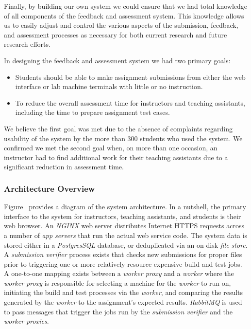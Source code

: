 Finally, by building our own system we could ensure that we had total knowledge
of all components of the feedback and assessment system. This knowledge allows
us to easily adjust and control the various aspects of the submission,
feedback, and assessment processes as necessary for both current research and
future research efforts.

In designing the feedback and assessment system we had two primary goals:

\begin{itemize}
\item Students should be able to make assignment submissions from either the
  web interface or lab machine terminals with little or no instruction.
\item To reduce the overall assessment time for instructors and teaching
  assistants, including the time to prepare assignment test cases.
\end{itemize}

We believe the first goal was met due to the absence of complaints regarding
usability of the system by the more than 300 students who used the system. We
confirmed we met the second goal when, on more than one occasion, an instructor
had to find additional work for their teaching assistants due to a significant
reduction in assessment time.


\subsubsection{Architecture Overview}
Figure~ provides a diagram of the system
architecture. In a nutshell, the primary interface to the system for
instructors, teaching assistants, and students is their web browser. An
\emph{NGINX} web server distributes Internet HTTPS requests across a number of
\emph{app servers} that run the actual web service code. The system data is
stored either in a \emph{PostgresSQL} database, or deduplicated via an on-disk
\emph{file store}. A \emph{submission verifier} process exists that checks new
submissions for proper files prior to triggering one or more relatively
resource expensive build and test jobs. A one-to-one mapping exists between a
\emph{worker proxy} and a \emph{worker} where the \emph{worker proxy} is
responsible for selecting a machine for the \emph{worker} to run on, initiating
the build and test processes via the \emph{worker}, and comparing the results
generated by the \emph{worker} to the assignment's expected
results. \emph{RabbitMQ} is used to pass messages that trigger the jobs run by
the \emph{submission verifier} and the \emph{worker proxies}.

